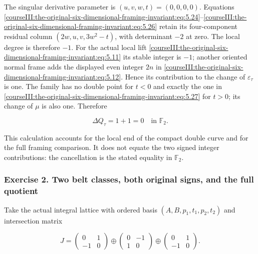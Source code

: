 The singular derivative parameter is \((u,v,w,t)=(0,0,0,0)\). Equations \eqref{courseIII:the-original-six-dimensional-framing-invariant:eq:5.24}--\eqref{courseIII:the-original-six-dimensional-framing-invariant:eq:5.26} retain its four-component residual column \((2w,u,v,3w^2-t)\), with determinant \(-2\) at zero. The local degree is therefore \(-1\). For the actual local lift \eqref{courseIII:the-original-six-dimensional-framing-invariant:eq:5.11} its stable integer is \(-1\); another oriented normal frame adds the displayed even integer \(2n\) in \eqref{courseIII:the-original-six-dimensional-framing-invariant:eq:5.12}. Hence its contribution to the change of \(\varepsilon_\tau\) is one. The family has no double point for \(t<0\) and exactly the one in \eqref{courseIII:the-original-six-dimensional-framing-invariant:eq:5.27} for \(t>0\); its change of \(\mu\) is also one. Therefore

\begin{equation}
\Delta Q_\tau=1+1=0\quad\text{in }\mathbb F_2.
 \label{courseIII:the-original-six-dimensional-framing-invariant:eq:10.6}
\end{equation}

This calculation accounts for the local end of the compact double curve and for the full framing comparison. It does not equate the two signed integer contributions: the cancellation is the stated equality in \(\mathbb F_2\).

\subsubsection{Exercise 2. Two belt classes, both original signs, and the full quotient}
\label{courseIII:the-original-six-dimensional-framing-invariant:exercise-2}

\label{courseIII:framed6:10.2}

Take the actual integral lattice with ordered basis
\((A,B,p_1,t_1,p_2,t_2)\) and intersection matrix

\begin{equation}
J=
 \begin{pmatrix}0&1\\-1&0\end{pmatrix}
 \oplus
 \begin{pmatrix}0&-1\\1&0\end{pmatrix}
 \oplus
 \begin{pmatrix}0&1\\-1&0\end{pmatrix}.
 \label{courseIII:the-original-six-dimensional-framing-invariant:eq:10.7}
\end{equation}

